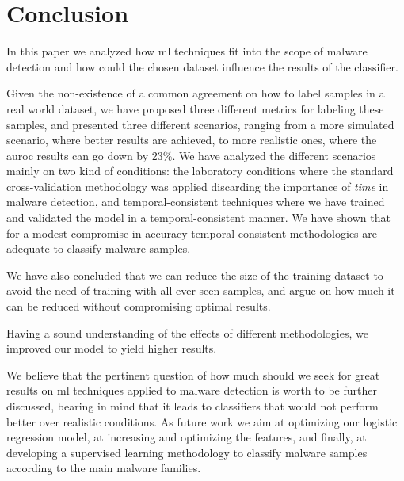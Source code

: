
\section{Conclusion}\label{sec:conclusion}

In this paper we analyzed how \gls{ml} techniques fit into the scope of malware detection and how could the chosen dataset influence the results of the classifier. 

Given the non-existence of a common agreement on how to label samples in a real world dataset, we have proposed three different metrics for labeling these samples, and presented three different scenarios, ranging from a more simulated scenario, where better results are achieved, to more realistic ones, where the \gls{auroc} results can go down by 23\%.
We have analyzed the different scenarios mainly on two kind of conditions: the laboratory conditions where the standard cross-validation methodology was applied discarding the importance of \emph{time} in malware detection, and temporal-consistent techniques where we have trained and validated the model in a temporal-consistent manner.
We have shown that for a modest compromise in accuracy temporal-consistent methodologies are adequate to classify malware samples.

We have also concluded that we can reduce the size of the training dataset to avoid the need of training with all ever seen samples, and argue on how much it can be reduced without compromising optimal results.

Having a sound understanding of the effects of different methodologies, we improved our model to yield higher results.

We believe that the pertinent question of how much should we seek for great results on \gls{ml} techniques applied to malware detection is worth to be further discussed, bearing in mind that it leads to classifiers that would not perform better over realistic conditions. 
As future work we aim at optimizing our logistic regression model, at increasing and optimizing the features, and finally, at developing a supervised learning methodology to classify malware samples according to the main malware families.
